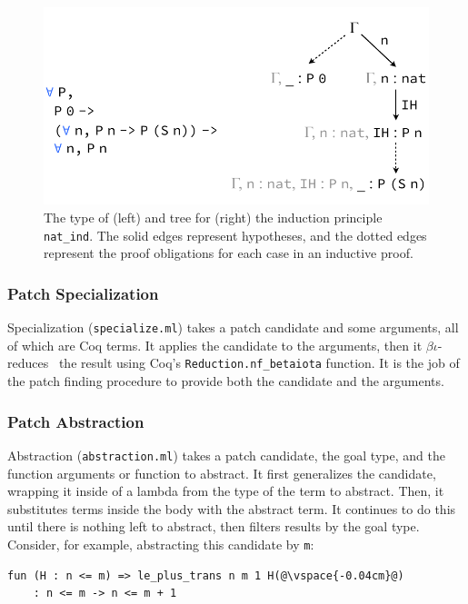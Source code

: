 \begin{figure}[t]
\begin{center}
\includegraphics[scale=0.55]{repair/nat_ind}
\end{center}
\caption{The type of (left) and tree for (right) the induction principle \lstinline{nat_ind}. The solid edges represent hypotheses, and the dotted edges represent the proof obligations for each case in an inductive proof.}
\label{fig:cattree}
\end{figure}

\subsubsection{Patch Specialization} Specialization (\lstinline{specialize.ml}) takes a patch candidate and some arguments,
all of which are Coq terms.
It applies the candidate to the arguments, then it $\beta\iota$-reduces~\cite{equality} the result using Coq's
\lstinline{Reduction.nf_betaiota} function. It is the job of the 
patch finding procedure to provide both the candidate and the arguments.

\subsubsection{Patch Abstraction} Abstraction (\lstinline{abstraction.ml}) takes a patch candidate, 
the goal type, and the function arguments or function to abstract.
It first generalizes the candidate, wrapping it inside of a lambda from the type of the term to abstract.
Then, it substitutes terms inside the body with the abstract term.
It continues to do this until there is nothing left to abstract, then filters results by the goal type.
Consider, for example, abstracting this candidate by \lstinline{m}:

\begin{lstlisting}[language=coq]
    fun (H : n <= m) => le_plus_trans n m 1 H(@\vspace{-0.04cm}@)
    : n <= m -> n <= m + 1
\end{lstlisting}

